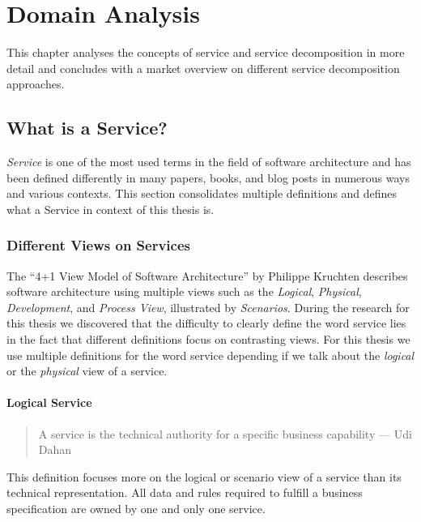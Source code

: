 \chapter{Domain Analysis}
\label{cha:analysis}

This chapter analyses the concepts of service and service decomposition in more detail and concludes with a market overview on different service decomposition approaches. 

\section{What is a Service?}
\label{sec:serviceIntro}

\textit{Service} is one of the most used terms in the field of software architecture and has been defined differently in many papers, books, and blog posts in numerous ways and various contexts. This section consolidates multiple definitions and defines what a Service in context of this thesis is.

\subsection{Different Views on Services}

The \enquote{4+1 View Model of Software Architecture} by Philippe Kruchten\cite{fourPlusOne} describes software architecture using multiple views such as the \textit{Logical}, \textit{Physical}, \textit{Development}, and \textit{Process View}, illustrated by \textit{Scenarios}. During the research for this thesis we discovered that the difficulty to clearly define the word service lies in the fact that different definitions focus on contrasting views. For this thesis we use multiple definitions for the word service depending if we talk about the \textit{logical} or the \textit{physical} view of a service.

\subsubsection{Logical Service}

\begin{quotation}
A service is the technical authority for a specific business capability --- Udi Dahan\cite{serviceDefinitionDahan}
\end{quotation}
   
This definition focuses more on the logical or scenario view of a service than its technical representation. All data and rules required to fulfill a business specification are owned by one and only one service. 

